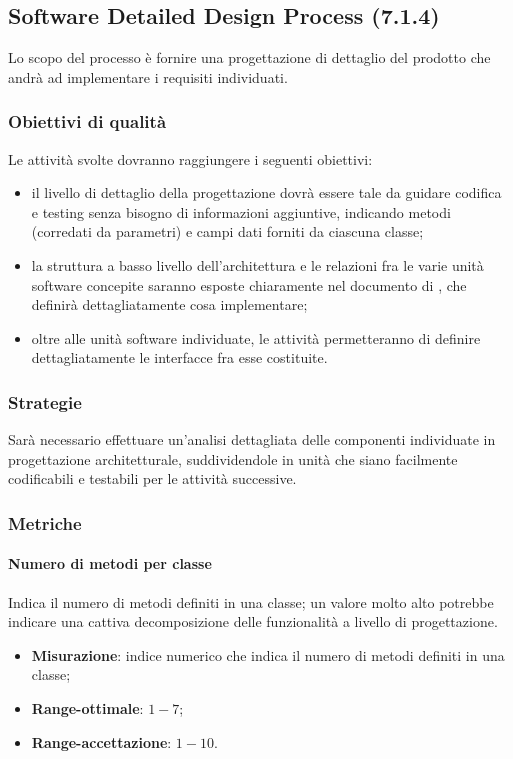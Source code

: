 \subsection{Software Detailed Design Process (7.1.4)}
\label{sySoDetailDesign}
Lo scopo del processo è fornire una progettazione di dettaglio del prodotto che andrà ad implementare i requisiti individuati.
\subsubsection{Obiettivi di qualità}
Le attività svolte dovranno raggiungere i seguenti obiettivi:
\begin{itemize}
\item il livello di dettaglio della progettazione dovrà essere tale da guidare codifica e testing senza bisogno di informazioni aggiuntive, indicando metodi (corredati da parametri) e campi dati forniti da ciascuna classe;
\item la struttura a basso livello dell'architettura e le relazioni fra le varie unità software concepite saranno esposte chiaramente nel documento di \textit{\DDP}, che definirà dettagliatamente cosa implementare;
\item oltre alle unità software individuate, le attività permetteranno di definire dettagliatamente le interfacce fra esse costituite.
\end{itemize}
\subsubsection{Strategie}
Sarà necessario effettuare un'analisi dettagliata delle componenti individuate in progettazione architetturale, suddividendole in unità che siano facilmente codificabili e testabili per le attività successive.
\subsubsection{Metriche}
\paragraph{Numero di metodi per classe}
\label{numMetodiClasse}
Indica il numero di metodi definiti in una classe; un valore molto alto potrebbe indicare una cattiva decomposizione delle funzionalità a livello di progettazione.
\begin{itemize}
\item \textbf{Misurazione}: indice numerico che indica il numero di metodi definiti in una classe;
\item \textbf{Range-ottimale}: $1 - 7$;
\item \textbf{Range-accettazione}: $1 - 10$.
\end{itemize}
